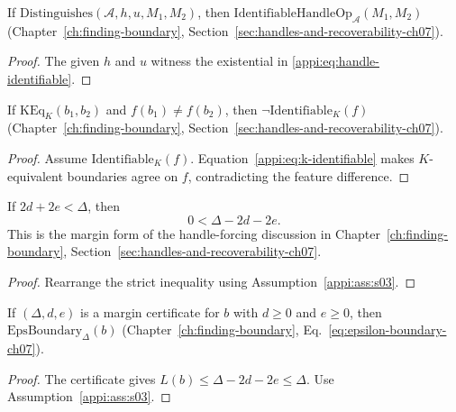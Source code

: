 \begin{lemma}
\label{appi:lem:p36}
If \(\mathrm{Distinguishes}(\mathcal A,h,u,M_1,M_2)\), then \(\mathrm{IdentifiableHandleOp}_{\mathcal A}(M_1,M_2)\) (Chapter~\ref{ch:finding-boundary}, Section~\ref{sec:handles-and-recoverability-ch07}).
\end{lemma}
\begin{proof}
The given \(h\) and \(u\) witness the existential in \eqref{appi:eq:handle-identifiable}.
\end{proof}

\begin{theorem}
\label{appi:thm:p34k}
If \(\mathrm{KEq}_{K}(b_1,b_2)\) and \(f(b_1)\neq f(b_2)\), then \(\neg\mathrm{Identifiable}_{K}(f)\) (Chapter~\ref{ch:finding-boundary}, Section~\ref{sec:handles-and-recoverability-ch07}).
\end{theorem}
\begin{proof}
Assume \(\mathrm{Identifiable}_{K}(f)\). Equation~\eqref{appi:eq:k-identifiable} makes \(K\)-equivalent boundaries agree on \(f\), contradicting the feature difference.
\end{proof}

\begin{lemma}
\label{appi:lem:p35m}
If \(2d+2e<\Delta\), then
\begin{equation}
\label{appi:eq:p35m}
0<\Delta-2d-2e .
\end{equation}
This is the margin form of the handle-forcing discussion in Chapter~\ref{ch:finding-boundary}, Section~\ref{sec:handles-and-recoverability-ch07}.
\end{lemma}
\begin{proof}
Rearrange the strict inequality using Assumption~\ref{appi:ass:s03}.
\end{proof}

\begin{lemma}
\label{appi:lem:p35m-cert}
If \((\Delta,d,e)\) is a margin certificate for \(b\) with \(d\geq0\) and \(e\geq0\), then \(\mathrm{EpsBoundary}_{\Delta}(b)\) (Chapter~\ref{ch:finding-boundary}, Eq.~\eqref{eq:epsilon-boundary-ch07}).
\end{lemma}
\begin{proof}
The certificate gives \(L(b)\leq \Delta-2d-2e\leq \Delta\). Use Assumption~\ref{appi:ass:s03}.
\end{proof}

